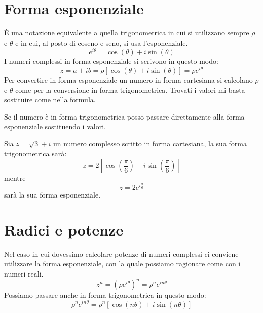 \section{Forma esponenziale}
\`E una notazione equivalente a quella trigonometrica in cui si utilizzano sempre $\rho$ e
$\theta$ e in cui, al posto di coseno e seno, si usa l'esponenziale.
\begin{equation*}
	e^{i \theta } = \cos{(\theta)} + i \sin{(\theta)}
\end{equation*}
I numeri complessi in forma esponenziale si scrivono in questo modo:
\begin{equation*}
	z = a + ib = \rho [\cos{(\theta)} + i \sin{(\theta)}] = \rho e^{i \theta }
\end{equation*}
Per convertire in forma esponenziale un numero in forma cartesiana si calcolano $\rho$ e
$\theta$ come per la conversione in forma trigonometrica. Trovati i valori mi basta sostituire
come nella formula.

Se il numero \`e in forma trigonometrica posso passare direttamente alla forma
esponenziale sostituendo i valori.

\begin{example}
	Sia $z = \sqrt{3} + i$ un numero complesso scritto in forma cartesiana, la sua forma
	trigonometrica sar\`a:
	\begin{equation*}
		z = 2 \left[ \cos{\left( \frac{\pi}{6} \right)} +
			i \sin{\left( \frac{\pi}{6} \right)} \right]
	\end{equation*}
	mentre
	\begin{equation*}
		z = 2 e^{i \frac{\pi}{6}}
	\end{equation*}
	sar\`a la sua forma esponenziale.
\end{example}

\section{Radici e potenze}
Nel caso in cui dovessimo calcolare potenze di numeri complessi ci conviene utilizzare la
forma esponenziale, con la quale possiamo ragionare come con i numeri reali.
\begin{equation*}
	z^n = (\rho e^{i \theta})^n = \rho^n e^{i n \theta}
\end{equation*}
Possiamo passare anche in forma trigonometrica in questo modo:
\begin{equation*}
	\rho^n e^{i n \theta} = \rho^n [\cos{(n \theta)} + i \sin{(n \theta)}]
\end{equation*}

